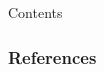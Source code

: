 \documentclass[10pt]{beamer}
\begin{document}
\begin{frame}
  \titlepage 
\end{frame}

\begin{frame}{Contents}
  \tableofcontents
\end{frame}



\begin{frame}[plain]
    \frametitle{References}
    
    
\end{frame}
\end{document}
